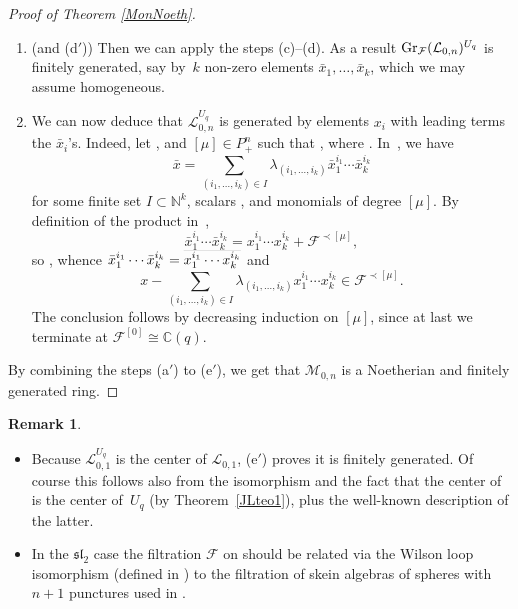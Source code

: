 \documentclass[pdftex]{sigma}
\numberwithin{equation}{section}
\theoremstyle{definition}
\newtheorem{Remark}[teo]{Remark}
\newcommand{\mc}{\mathbb{C}}
\newcommand{\mn}{\mathbb{N}}
\newcommand{\Ll}{{\mathcal L}}
\newcommand{\Mm}{{\mathcal M}}
\begin{document}
\begin{proof}[Proof of Theorem \ref{MonNoeth}]
\begin{enumerate}
\item[(c$'$)] (and (d$'$)) Then we can apply the steps (c)--(d). As a result ${\rm Gr}_{{\mathcal F}}({\mathcal L}_{0,n})^{U_q}$ is finitely generated, say by~$k$ non-zero elements $\bar{x}_1,\dots,\bar{x}_k$, which we may assume homogeneous.
\item[(e$'$)] We can now deduce that $\Ll_{0,n}^{U_q}$ is generated by elements $x_i$ with leading terms the
$\bar{x}_i$'s. Indeed, let \smash{$x\in \Ll_{0,n}^{U_q}$}, and $[\mu]\in P_+^n$ such that , where . In~, we have
\[
 \bar{x}\! =\! \sum_{(i_1,\dots ,i_k)\in I} \lambda_{(i_1,\dots ,i_k)} \bar{x}_1^{i_1}\cdots\bar{x}_k^{i_k}
 \]
 for some finite set ${I\!\subset\! \mn^k}$, scalars \smash{$\lambda_{(i_1,\dots ,i_k)}\in \mc(q)$}, and monomials  of degree $[\mu]$. By definition of the product in~, \[
 \bar{x}_1^{i_1}\cdots\bar{x}_k^{i_k} = x_1^{i_1}\cdots x_k^{i_k} + {\mathcal F}^{\prec[\mu]},
 \]
 so , whence $\smash{\bar{x}_1^{i_1}\cdots\bar{x}_k^{i_k}} = \smash{\overline{x_1^{i_1}\cdots x_k^{i_k}}}$ and
 \[
 x- \sum_{(i_1,\dots ,i_k)\in I} \lambda_{(i_1,\dots ,i_k)} x_1^{i_1}\cdots x_k^{i_k} \in {\mathcal F}^{\prec [\mu]}.
 \]
 The conclusion follows by decreasing induction on $[\mu]$, since at last we terminate at ${{\mathcal F}^{[0]}\cong \mc(q)}$.
\end{enumerate}

By combining the steps (a$'$) to (e$'$), we get that $\Mm_{0,n}$ is a Noetherian and finitely generated ring.
\end{proof}

\begin{Remark} \quad
\begin{itemize}\itemsep=0pt
\item[(1)] Because ${\mathcal L}_{0,1}^{U_q}$ is the center of ${\mathcal L}_{0,1}$, (e$'$) proves it is finitely generated. Of course this follows also from the isomorphism \smash{$\Ll_{0,1}\cong U_q^{\rm lf}$} and the fact that the center of  is the center of~$U_q$ (by Theorem~\ref{JLteo1}), plus the well-known description of the latter.
\item[(2)] In the ${\mathfrak{sl}_2}$ case the filtration $\mathcal{F}$ on  should be related via the Wilson loop isomorphism (defined in \cite[Section 8.2]{BR}) to the filtration of skein algebras of spheres with $n+1$ punctures used in \cite{PS}.
 \end{itemize}
\end{Remark}
\end{document}
